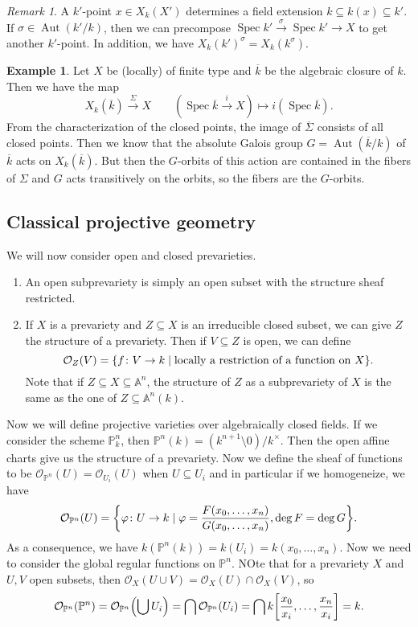 \documentclass[leqno, openany]{memoir}
\theoremstyle{definition}
\newtheorem{exm}[thm]{Example}
\theoremstyle{remark}
\newtheorem{rmk}[thm]{Remark}
\theoremstyle{plain}
\theoremstyle{definition}
\theoremstyle{remark}
\newcommand{\A}{\mathbb{A}}
\renewcommand{\P}{\mathbb{P}}
\newcommand{\mc}[1]{\mathcal{#1}}
\newcommand{\ol}[1]{\overline{#1}}
\DeclareMathOperator{\Aut}{Aut}
\DeclareMathOperator{\Spec}{Spec}
\begin{document}
\begin{rmk} A $k'$-point $x \in X_k(X')$ determines a field extension $k
    \subseteq k(x) \subseteq k'$. If $\sigma \in \Aut(k'/k)$, then we can
    precompose $\Spec k' \xrightarrow{\sigma} \Spec k' \to X$ to get another
    $k'$-point. In addition, we have ${X_k(k')^{\sigma} = X_k(k^{\sigma})}$.
\end{rmk}

\begin{exm} Let $X$ be (locally) of finite type and $\ol{k}$ be the algebraic
    closure of $k$. Then we have the map \[ X_k(\ol{k}) \xrightarrow{\Sigma} X
    \qquad (\Spec \ol{k} \xrightarrow{i} X) \mapsto i(\Spec \ol{k}). \] From
    the characterization of the closed points, the image of $\ol{\Sigma}$
    consists of all closed points. Then we know that the absolute Galois group
    $G = \Aut(\ol{k} / k)$ of $\ol{k}$ acts on $X_k(\ol{k})$. But then the
    $G$-orbits of this action are contained in the fibers of $\Sigma$ and $G$
    acts transitively on the orbits, so the fibers are the $G$-orbits.
\end{exm}

\subsection{Classical projective geometry}%
\label{sub:classical_projective_geometry}

We will now consider open and closed prevarieties.  \begin{enumerate} \item An
    open subprevariety is simply an open subset with the structure sheaf
    restricted.  \item If $X$ is a prevariety and $Z \subseteq X$ is an
    irreducible closed subset, we can give $Z$ the structure of a prevariety.
    Then if $V \subseteq Z$ is open, we can define \[ \mc{O}_Z(V) = \qty{f
    \colon V \to k \mid \text{locally a restriction of a function on $X$}}. \]
    Note that if $Z \subseteq X \subseteq \A^n$, the structure of $Z$ as a
    subprevariety of $X$ is the same as the one of $Z \subseteq \A^n(k)$.
    \end{enumerate}

Now we will define projective varieties over algebraically closed fields. If we
consider the scheme $\P^n_k$, then $\P^n(k) = (k^{n+1} \setminus \qty{0}) /
k^{\times}$. Then the open affine charts give us the structure of a prevariety.
Now we define the sheaf of functions to be $\mc{O}_{\P^n}(U) = \mc{O}_{U_i}(U)$
when $U \subseteq U_i$ and in particular if we homogeneize, we have \[
\mc{O}_{\P^n}(U) = \qty{\varphi \colon U \to k \mid \varphi = \frac{F(x_0,
\ldots, x_n)}{G(x_0, \ldots, x_n)}, \deg F = \deg G}. \] As a consequence, we
have $k(\P^n(k)) = k(U_i) = k(x_0, \ldots, x_n)$. Now we need to consider the
global regular functions on $\P^n$. NOte that for a prevariety $X$ and $U,V$
open subsets, then $\mc{O}_X(U \cup V) = \mc{O}_X(U) \cap \mc{O}_X(V)$, so \[
\mc{O}_{\P^n}(\P^n) = \mc{O}_{\P^n} \qty(\bigcup U_i) = \bigcap
\mc{O}_{\P^n}(U_i) = \bigcap k\qty[ \frac{x_0}{x_i}, \ldots, \frac{x_n}{x_i} ]
= k. \]
\end{document}
